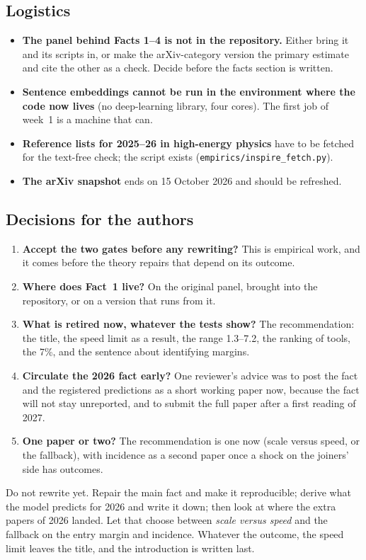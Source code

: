 \subsection{Logistics}

\begin{itemize}
\item \textbf{The panel behind Facts 1--4 is not in the repository.} Either bring it and its scripts in, or make the arXiv-category version the primary estimate and cite the other as a check. Decide before the facts section is written.
\item \textbf{Sentence embeddings cannot be run in the environment where the code now lives} (no deep-learning library, four cores). The first job of week~1 is a machine that can.
\item \textbf{Reference lists for 2025--26 in high-energy physics} have to be fetched for the text-free check; the script exists (\texttt{empirics/inspire\_fetch.py}).
\item \textbf{The arXiv snapshot} ends on 15 October 2026 and should be refreshed.
\end{itemize}

\subsection{Decisions for the authors}

\begin{enumerate}
\item \textbf{Accept the two gates before any rewriting?} This is empirical work, and it comes before the theory repairs that depend on its outcome.
\item \textbf{Where does Fact~1 live?} On the original panel, brought into the repository, or on a version that runs from it.
\item \textbf{What is retired now, whatever the tests show?} The recommendation: the title, the speed limit as a result, the range 1.3--7.2, the ranking of tools, the 7\%, and the sentence about identifying margins.
\item \textbf{Circulate the 2026 fact early?} One reviewer's advice was to post the fact and the registered predictions as a short working paper now, because the fact will not stay unreported, and to submit the full paper after a first reading of 2027.
\item \textbf{One paper or two?} The recommendation is one now (scale versus speed, or the fallback), with incidence as a second paper once a shock on the joiners' side has outcomes.
\end{enumerate}

\begin{keybox}
Do not rewrite yet.
Repair the main fact and make it reproducible; derive what the model predicts for 2026 and write it down; then look at where the extra papers of 2026 landed.
Let that choose between \emph{scale versus speed} and the fallback on the entry margin and incidence.
Whatever the outcome, the speed limit leaves the title, and the introduction is written last.
\end{keybox}
